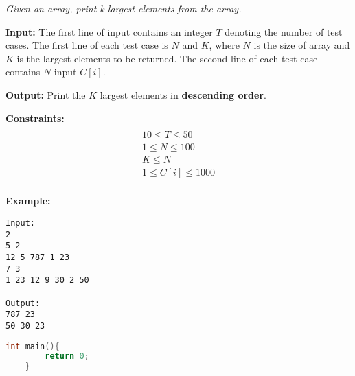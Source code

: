 \begin{problem}
\textit{Given an array, print k largest elements from the array.}

\textbf{Input:}
The first line of input contains an integer $T$ denoting the number of test cases.
The first line of each test case is $N$ and $K$, where $N$ is the size of array and $K$ is the largest elements to be returned.
The second line of each test case contains $N$ input $C[i]$.

\textbf{Output:}
Print the $K$ largest elements in \textbf{descending order}.

\textbf{Constraints:}
\begin{multline}\\
10 \leq T \leq 50\\
1 \leq N \leq 100\\
K \leq N \\
1 \leq C[i] \leq 1000\\
\end{multline}

\textbf{Example:}
\begin{verbatim}
Input:
2
5 2
12 5 787 1 23
7 3
1 23 12 9 30 2 50

Output:
787 23
50 30 23

\end{verbatim}

\end{problem}

\begin{solution}
\begin{lstlisting}[language=C++, caption="C++ Solution"]
	int main(){
		return 0;	
	}
\end{lstlisting}

\end{solution}



